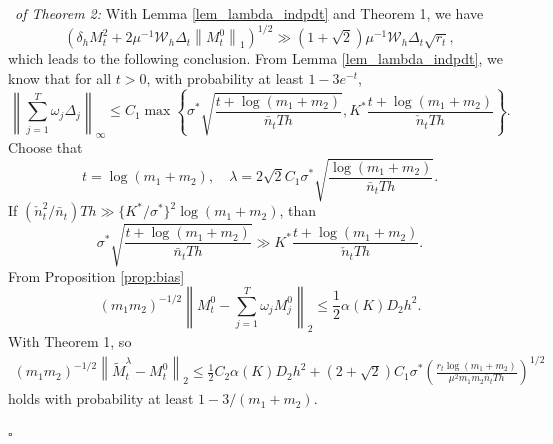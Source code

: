 \documentclass[12pt]{article}
\def\rank{\mathop{\rm rank}}
\newenvironment{pf}{{\noindent\it Proof}\ }{\hfill $\square$\par}
\begin{document}
\begin{pf}{\it of Theorem 2:}
With Lemma \ref{lem_lambda_indpdt} and Theorem 1, we have $$\left(\delta_h M_{t}^2 + 2\mu^{-1}\mathcal{W}_h\Delta_{t}\left\|M_t^0\right\|_1\right)^{1/2}\gg{(1+\sqrt{2})}{\mu^{-1}}{\mathcal{W}_h\Delta_{t}}\sqrt{r_t},$$ which leads to the following conclusion. 
  From Lemma \ref{lem_lambda_indpdt}, we know that for all $t>0$, with probability at least $1-3e^{-t}$,
  \begin{equation*}
  \left\|\sum_{j=1}^T \omega_j\Delta_j \right\|_\infty  \le {C_1}\max\left\{\sigma^*\sqrt{\frac{t+\log(m_1+m_2)}{\bar{n}_t Th}},K^*\frac{t + \log(m_1+m_2)}{\check{n}_t Th}\right\}.
  \end{equation*}
  Choose that $$t=\log(m_1+m_2),\quad 
  \lambda = 2\sqrt{2}C_1\sigma^*\sqrt{\frac{\log(m_1+m_2)}{\bar{n}_t Th}}.$$
  If $(\check{n}_t^2/\bar{n}_t) T h \gg\{K^*/\sigma^*\}^2 \log(m_1+m_2)$, than $$\sigma^*\sqrt{\frac{t+\log(m_1+m_2)}{\bar{n}_t Th}}\gg K^*\frac{t + \log(m_1+m_2)}{\check{n}_t Th}.$$
   From Proposition \ref{prop:bias}
  \begin{equation*}
       (m_1m_2)^{-1/2}\left\|M_t^0 - \sum_{j=1}^T \omega_j M_j^0\right\|_2 \le \frac{1}{2} \alpha(K)D_2 h^2.
  \end{equation*}
  With Theorem 1, so
  \begin{align*}
  (m_1m_2)^{-1/2}\left\|\widetilde{M}_t^\lambda - M_t^0\right\|_2 \le \frac{1}{2}C_2\alpha(K)D_2h^2 + \left(2+\sqrt{2}\right)C_1\sigma^*\left(\frac{r_t\log(m_1+m_2)}{\mu^2m_1m_2 \bar{n}_t Th}\right)^{1/2}
  \end{align*}
  holds with probability at least $1-3/(m_1+m_2)$.

\end{pf}

\end{document}
